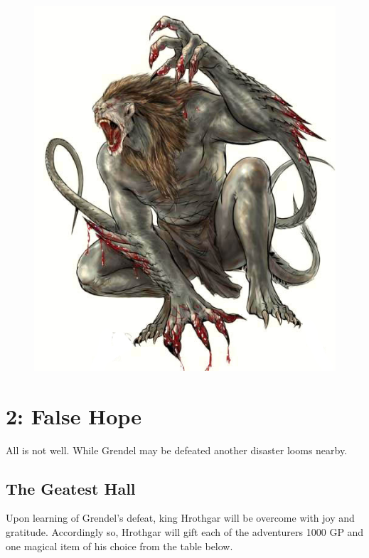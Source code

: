 \documentclass[10pt,twoside,twocolumn,openany]{book}
\begin{document}
\begin{figure}

	\vspace{-4.5cm}
	
	\centerline{
		\includegraphics[scale=1]{grendel}
	}
\end{figure}

\clearpage

\chapter{2: False Hope}

All is not well. While Grendel may be defeated another disaster looms nearby.

\section{The Geatest Hall}
Upon learning of Grendel's defeat, king Hrothgar will be overcome with joy and gratitude. Accordingly so, Hrothgar will gift each of the adventurers 1000 GP and one magical item of his choice from the table below.
\end{document}
